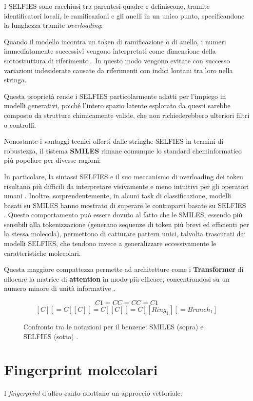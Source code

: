 I SELFIES sono racchiusi tra parentesi quadre e definiscono, tramite identificatori locali, le ramificazioni e gli anelli in un unico punto, specificandone la lunghezza tramite \textit{overloading}:

Quando il modello incontra un token di ramificazione o di anello, i numeri immediatamente successivi vengono interpretati come dimensione della sottostruttura di riferimento \cite{leonComparingSMILESSELFIES2024}.
In questo modo vengono evitate con successo variazioni indesiderate causate da riferimenti con indici lontani tra loro nella stringa.

Questa proprietà rende i SELFIES particolarmente adatti per l'impiego in modelli generativi, poiché l'intero spazio latente esplorato da questi sarebbe composto da strutture chimicamente valide, che non richiederebbero ulteriori filtri o controlli.

Nonostante i vantaggi tecnici offerti dalle stringhe SELFIES in termini di robustezza, il sistema \textbf{SMILES} rimane comunque lo standard cheminformatico più popolare per diverse ragioni:

In particolare, la sintassi SELFIES e il suo meccanismo di overloading dei token risultano più difficili da interpretare visivamente e meno intuitivi per gli operatori umani \cite{leonComparingSMILESSELFIES2024}.
Inoltre, sorprendentemente, in alcuni task di classificazione, modelli basati su SMILES hanno mostrato di superare le controparti basate su SELFIES \cite{leonComparingSMILESSELFIES2024}. Questo comportamento può essere dovuto al fatto che le SMILES, essendo più sensibili alla tokenizzazione (generano sequenze di token più brevi ed efficienti per la stessa molecola), permettono di catturare pattern unici, talvolta trascurati dai modelli SELFIES, che tendono invece a generalizzare eccessivamente le caratteristiche molecolari.

Questa maggiore compattezza permette ad architetture come i \textbf{Transformer} di allocare la matrice di \textbf{attention} in modo più efficace, concentrandosi su un numero minore di unità informative \cite{leonComparingSMILESSELFIES2024}.
\begin{figure}[htbp]
    \centering
    $$C1=CC=CC=C1$$
    $$[C][=C][C][=C][C][=C][Ring_1][=Branch_1]$$
    \caption{Confronto tra le notazioni per il benzene: SMILES (sopra) e SELFIES (sotto) \cite{krennSELFIESFutureMolecular2022}.}
    \label{fig:smiles_vs_selfies}
\end{figure}
\section{Fingerprint molecolari}
\label{sec:fingerprint}
I \textit{fingerprint} d'altro canto adottano un approccio vettoriale:

